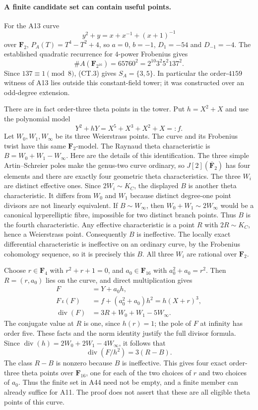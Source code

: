 \paragraph{A finite candidate set can contain useful points.}
For the A13 curve
\[
 y^2+y=x+x^{-1}+(x+1)^{-1}
\]
over $\mathbf F_2$, $P_A(T)=T^4-T^2+4$, so $a=0$, $b=-1$,
$D_1=-54$ and $D_{-1}=-4$. The established quadratic recurrence
for $4$-power Frobenius gives
\[
 \#A(\mathbf F_{2^{16}})=65760^2
                    =2^{10}3^2 5^2 137^2.
 \tag{CT.14}
\]
Since $137\equiv1\pmod8$, (CT.3) gives $S_A=\{3,5\}$.
In particular the order-$4159$ witness of A13 lies outside this
constant-field tower; it was constructed over an odd-degree
extension.

There are in fact order-three theta points in the tower.
Put $h=X^2+X$ and use the polynomial model
\[
 Y^2+hY=X^5+X^3+X^2+X=:f.
\]
Let $W_0,W_1,W_\infty$ be its three Weierstrass points.
The curve and its Frobenius twist have this same
$\mathbf F_2$-model. The Raynaud theta characteristic is
$B=W_0+W_1-W_\infty$.
Here are the details of this identification. The three simple
Artin--Schreier poles make the genus-two curve ordinary, so
$J[2](\overline{\mathbf F}_2)$ has four elements and there are
exactly four geometric theta characteristics. The three $W_i$
are distinct effective ones. Since $2W_i\sim K_C$, the displayed
$B$ is another theta characteristic. It differs from $W_0$
and $W_1$ because distinct degree-one point divisors are not
linearly equivalent. If $B\sim W_\infty$, then
$W_0+W_1\sim2W_\infty$ would be a canonical hyperelliptic fibre,
impossible for two distinct branch points. Thus $B$ is the
fourth characteristic. Any effective characteristic is a point
$R$ with $2R\sim K_C$, hence a Weierstrass point. Consequently
$B$ is ineffective. The locally exact differential
characteristic is ineffective on an ordinary curve, by the
Frobenius cohomology sequence, so it is precisely this $B$.
All three $W_i$ are rational over $\mathbf F_2$.

Choose $r\in\mathbf F_4$ with $r^2+r+1=0$, and
$a_0\in\mathbf F_{16}$ with $a_0^2+a_0=r^2$.
Then $R=(r,a_0)$ lies on the curve, and direct multiplication gives
\[
 \begin{aligned}
 F&=Y+a_0h,\\
 F\,\iota(F)&=f+(a_0^2+a_0)h^2
                          =h(X+r)^3,\\
 \operatorname{div}(F)&=3R+W_0+W_1-5W_\infty.
 \end{aligned}
 \tag{CT.15}
\]
The conjugate value at $R$ is one, since $h(r)=1$; the pole of
$F$ at infinity has order five. These facts and the norm identity
justify the full divisor formula. Since
$\operatorname{div}(h)=2W_0+2W_1-4W_\infty$, it follows that
\[
                    \operatorname{div}(F/h^2)=3(R-B).
 \tag{CT.16}
\]
The class $R-B$ is nonzero because $B$ is ineffective.
This gives four exact order-three theta points over
$\mathbf F_{16}$, one for each of the two choices of $r$ and
two choices of $a_0$. Thus the finite set in A44 need not be
empty, and a finite member can already suffice for A11.
The proof does not assert that these are all eligible theta
points of this curve.

